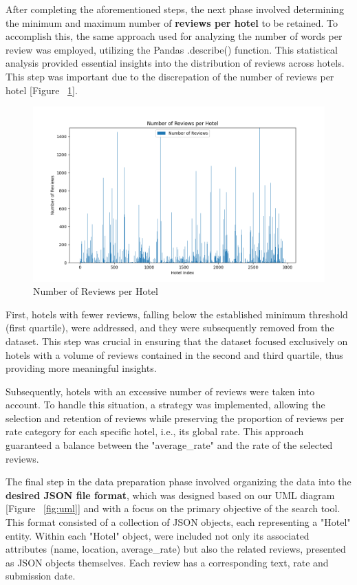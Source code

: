 \documentclass[sigconf]{acmart}
\begin{document}
After completing the aforementioned steps, the next phase involved determining the minimum and maximum number of \textbf{reviews per hotel} to be retained. To accomplish this, the same approach used for analyzing the number of words per review was employed, utilizing the Pandas \cite{Pandas} .describe() function. This statistical analysis provided essential insights into the distribution of reviews across hotels. This step was important due to the discrepation of the number of reviews per hotel [Figure ~\ref{fig:reviewsHotel}].

\begin{figure}[H]
  \centering
  \includegraphics[width=\linewidth]{imgs/hotel_reviews_number.png}
  \caption{Number of Reviews per Hotel}
  \label{fig:reviewsHotel}
\end{figure}

First, hotels with fewer reviews, falling below the established minimum threshold (first quartile), were addressed, and they were subsequently removed from the dataset. This step was crucial in ensuring that the dataset focused exclusively on hotels with a volume of reviews contained in the second and third quartile, thus providing more meaningful insights.

Subsequently, hotels with an excessive number of reviews were taken into account. To handle this situation, a strategy was implemented, allowing the selection and retention of reviews while preserving the proportion of reviews per rate category for each specific hotel, i.e., its global rate. This approach guaranteed a balance between the "average\_rate" and the rate of the selected reviews.

The final step in the data preparation phase involved organizing the data into the \textbf{desired JSON file format}, which was designed based on our UML diagram [Figure ~\ref{fig:uml}] and with a focus on the primary objective of the search tool. This format consisted of a collection of JSON objects, each representing a "Hotel" entity. Within each "Hotel" object, were included not only its associated attributes (name, location, average\_rate) but also the related reviews, presented as JSON objects themselves. Each review has a corresponding text, rate and submission date.
\end{document}
